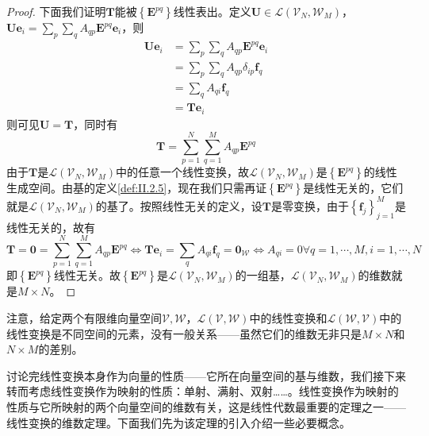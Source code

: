 \documentclass[main.tex]{subfiles}
\begin{document}
\begin{proof}
    下面我们证明$\mathbf{T}$能被$\left\{\mathbf{E}^{pq}\right\}$线性表出。定义$\mathbf{U}\in\mathcal{L}\left(\mathcal{V}_N,\mathcal{W}_M\right)$，$\mathbf{Ue}_i=\sum_p\sum_qA_{qp}\mathbf{E}^{pq}\mathbf{e}_i$，则
    \begin{align*}
        \mathbf{Ue}_i & =\sum_p\sum_qA_{qp}\mathbf{E}^{pq}\mathbf{e}_i \\
                      & =\sum_p\sum_qA_{qp}\delta_{ip}\mathbf{f}_q     \\
                      & =\sum_qA_{qi}\mathbf{f}_q                      \\
                      & =\mathbf{Te}_i
    \end{align*}
    则可见$\mathbf{U}=\mathbf{T}$，同时有
    \[\mathbf{T}=\sum_{p=1}^N\sum_{q=1}^MA_{qp}\mathbf{E}^{pq}\]
    由于$\mathbf{T}$是$\mathcal{L}\left(\mathcal{V}_N,\mathcal{W}_M\right)$中的任意一个线性变换，故$\mathcal{L}\left(\mathcal{V}_N,\mathcal{W}_M\right)$是$\left\{\mathbf{E}^{pq}\right\}$的线性生成空间。由基的定义\ref{def:II.2.5}，现在我们只需再证$\left\{\mathbf{E}^{pq}\right\}$是线性无关的，它们就是$\mathcal{L}\left(\mathcal{V}_N,\mathcal{W}_M\right)$的基了。按照线性无关的定义，设$\mathbf{T}$是零变换，由于$\left\{\mathbf{f}_j\right\}_{j=1}^M$是线性无关的，故有
    \[\mathbf{T}=\mathbf{0}=\sum_{p=1}^N\sum_{q=1}^MA_{qp}\mathbf{E}^{pq}\Leftrightarrow\mathbf{Te}_i=\sum_q A_{qi}\mathbf{f}_q=\mathbf{0}_\mathcal{W}\Leftrightarrow A_{qi}=0\forall q=1,\cdots,M,i=1,\cdots,N\]
    即$\left\{\mathbf{E}^{pq}\right\}$线性无关。故$\left\{\mathbf{E}^{pq}\right\}$是$\mathcal{L}\left(\mathcal{V}_N,\mathcal{W}_M\right)$的一组基，$\mathcal{L}\left(\mathcal{V}_N,\mathcal{W}_M\right)$的维数就是$M\times N$。
\end{proof}

注意，给定两个有限维向量空间$\mathcal{V},\mathcal{W}$，$\mathcal{L}\left(\mathcal{V},\mathcal{W}\right)$中的线性变换和$\mathcal{L}\left(\mathcal{W},\mathcal{V}\right)$中的线性变换是不同空间的元素，没有一般关系——虽然它们的维数无非只是$M\times N$和$N\times M$的差别。

讨论完线性变换本身作为向量的性质——它所在向量空间的基与维数，我们接下来转而考虑线性变换作为映射的性质：单射、满射、双射……。线性变换作为映射的性质与它所映射的两个向量空间的维数有关，这是线性代数最重要的定理之一——线性变换的维数定理。下面我们先为该定理的引入介绍一些必要概念。
\end{document}
